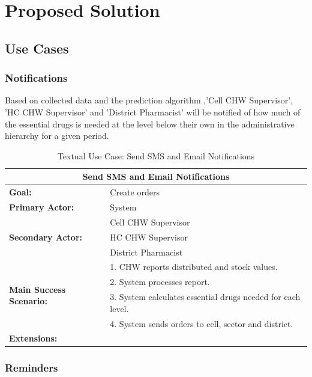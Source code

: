 \documentclass[a4paper, 11pt]{report}
\begin{document}
\chapter{Proposed Solution}

\section{Use Cases}

\subsection{Notifications}

Based on collected data and the prediction algorithm ,'Cell CHW Supervisor', 'HC CHW Supervisor' and 'District Pharmacist' will be notified of how much of the essential drugs is needed at the level below their own in the administrative hierarchy for a given period. 

\begin{table}[h]
	\centering
	\begin{tabular}{|l|l|}
		\hline
		\multicolumn{2}{|c|}{\textbf{Send SMS and Email Notifications}}\\
		\hline
		\textbf{Goal:} & Create orders\\
		\hline
		\textbf{Primary Actor:} & System\\
		\hline
		\multirow{3}{*}{\textbf{Secondary Actor:}}	& Cell CHW Supervisor \\
																								& HC CHW Supervisor \\ 
																								& District Pharmacist \\
		\hline
		\multirow{4}{*}{\textbf{Main Success Scenario:}}	& 1. CHW reports distributed and stock values. \\
																											& 2. System processes report. \\
																											& 3. System calculates essential drugs needed for each level. \\
																											& 4. System sends orders to cell, sector and district. \\
		\hline
		\textbf{Extensions:} & \\
		\hline
	\end{tabular}
	\caption{Textual Use Case: Send SMS and Email Notifications}
\end{table}
\pagebreak

\subsection{Reminders}
\end{document}
